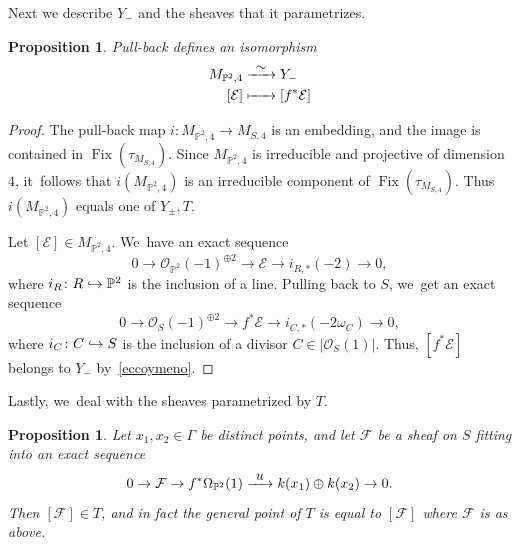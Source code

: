\documentclass[JEP,XML,SOM,Unicode,published]{cedram}
\newcommand\hto{\mathrel{\lhook\joinrel\to}}
\newcommand\To[1]{\mathchoice{\xrightarrow{\textstyle\kern4pt#1\kern3pt}}{\stackrel{#1}{\longrightarrow}}{}{}}
\newcommand\Mto[1]{\mathrel{\mapstochar\To{#1}}}
\newcommand{\PP}{{\mathbb P}}\let\P\PP
\newcommand\cE{\mathcal{E}}
\newcommand\cF{\mathcal{F}}
\newcommand\cO{\mathcal{O}}
\DeclareMathOperator{\Fix}{Fix}
\let\hra\hto
\newtheorem{prop}[lemm]{Proposition}
\theoremstyle{definition}
\begin{document}
Next we describe $Y_-$ and the sheaves that it parametrizes.

\begin{prop}\label{prop:ypsilonmeno}
Pull-back defines an isomorphism
\begin{equation*}
\begin{aligned}
M_{\PP^2,4} & \To{\sim} Y_{-}\\
[\cE] & \Mto{\hphantom{\sim}}  [f^{*}\cE]
\end{aligned}
\end{equation*}
\end{prop}

\begin{proof}
The pull-back map $i\colon M_{\PP^2,4}\to M_{S,4}$ is an embedding, and the image is contained in $\Fix(\tau_{M_{S,4}})$. Since $M_{\PP^2,4}$ is irreducible and projective of dimension $4$, it~follows that $i(M_{\PP^2,4})$ is an irreducible component of $\Fix(\tau_{M_{S,4}})$. Thus $i(M_{\PP^2,4})$ equals one of $Y_{\pm},T$.

Let $[\cE]\in M_{\PP^2,4}$. We~have an exact sequence
\begin{equation*}
0\to \cO_{\PP^2}(-1)^{\oplus 2}\to \cE\to i_{R,*}(-2)\to 0,
\end{equation*}
where $i_R\colon R\hra\PP^2$ is the inclusion of a line. Pulling back to $S$, we~get
an exact sequence
\begin{equation*}
0\to \cO_{S}(-1)^{\oplus 2}\to f^{*}\cE\to i_{C,*}(-2\omega_C)\to 0,
\end{equation*}
where $i_C\colon C\hra S $ is the inclusion of a divisor $C\in|\cO_S(1)|$. Thus, $[f^{*}\cE]$ belongs to $Y_{-}$ by~\eqref{eccoymeno}.
\end{proof}

Lastly, we~deal with the sheaves parametrized by $T$.

\begin{prop}\label{prop:eccoti}
Let $x_1,x_2\in{\mathsf\Gamma}$ be distinct points, and let $\cF$ be a sheaf on $S$
fitting into an exact sequence
\begin{equation}\label{eccoeffe}
0\to \cF \to f^*\Omega_{\P^2}(1) \To{u} k(x_1)\oplus k(x_2)\to 0.
\end{equation}
Then $[\cF]\in T$, and in fact the general point of $T$ is equal to $[\cF]$ where $\cF$ is as above.
\end{prop}
\end{document}
